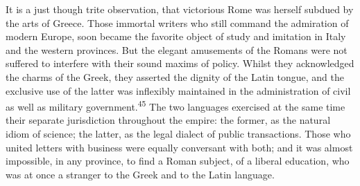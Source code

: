 


It is a just though trite observation, that victorious Rome was
herself subdued by the arts of Greece. Those immortal writers who
still command the admiration of modern Europe, soon became the
favorite object of study and imitation in Italy and the western
provinces. But the elegant amusements of the Romans were not
suffered to interfere with their sound maxims of policy. Whilst
they acknowledged the charms of the Greek, they asserted the
dignity of the Latin tongue, and the exclusive use of the latter
was inflexibly maintained in the administration of civil as well
as military government.\textsuperscript{45} The two languages exercised at the
same time their separate jurisdiction throughout the empire: the
former, as the natural idiom of science; the latter, as the legal
dialect of public transactions. Those who united letters with
business were equally conversant with both; and it was almost
impossible, in any province, to find a Roman subject, of a
liberal education, who was at once a stranger to the Greek and to
the Latin language.


